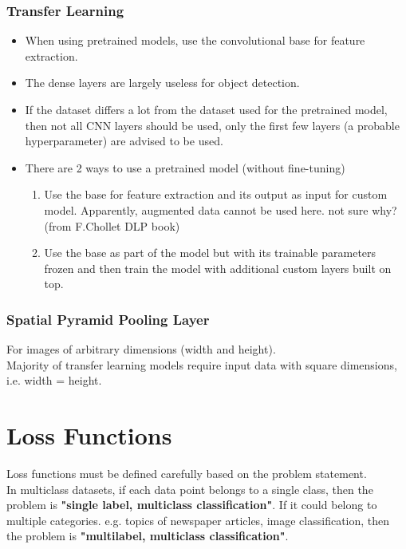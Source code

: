 \documentclass[a4paper, 12pt]{report}
\begin{document}
\subsection{Transfer Learning}
\label{subsec:transflearning}
\begin{itemize}
\item When using pretrained models, use the convolutional base for feature extraction.
\item The dense layers are largely useless for object detection.
\item If the dataset differs a lot from the dataset used for the pretrained model, then not all CNN layers should be used, only the first few layers (a probable hyperparameter) are advised to be used.
\item There are 2 ways to use a pretrained model (without fine-tuning)
	\begin{enumerate}
	\item Use the base for feature extraction and its output as input for custom model. Apparently, augmented data cannot be used here. {\color{red}not sure why? (from F.Chollet DLP book)}
	\item Use the base as part of the model but with its trainable parameters frozen and then train the model with additional custom layers built on top.
	\end{enumerate}
\end{itemize}

\subsection{Spatial Pyramid Pooling Layer}
For images of arbitrary dimensions (width and height).\\
Majority of transfer learning models require input data with square dimensions, i.e. width = height.

\chapter{Loss Functions}
Loss functions must be defined carefully based on the problem statement.\\

In multiclass datasets, if each data point belongs to a single class, then the problem is \textbf{"single label, multiclass classification"}. If it could belong to multiple categories. e.g. topics of newspaper articles, image classification, then the problem is \textbf{"multilabel, multiclass classification"}.
\end{document}
